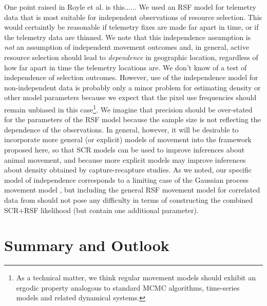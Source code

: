 One point raised in Royle et al. is this......
We used an RSF model for telemetry data that is most suitable for
independent observations of resource selection.  This would certaintly
be reasonable if telemetry fixes are made far apart in time, or if the
telemetry data are thinned.  We note that this independence assumption
is {\it not} an assumption of independent movement outcomes and, in
general, active resource selection should lead to {\it dependence} in
geographic location, regardless of how far apart in time the telemetry
locations are.  We don't know of a test of independence of selection
outcomes. However, use of the independence model for non-independent
data is probably only a minor problem for estimating density or other
model parameters because we expect that the pixel use frequencies
should remain unbiased in this case\footnote{As a technical matter, we
  think regular movement models should exhibit an ergodic property
  analogous to standard MCMC algorithms, time-series models and
  related dynamical systems.}.  We imagine that precision should be
over-stated for the parameters of the RSF model because the sample
size is not reflecting the dependence of the observations.  In
general, however, it will be desirable to incorporate more general (or
explicit) models of movement into the framework proposed here, so that
SCR models can be used to improve inferences about animal movement,
and because more explicit models may improve inferences about density
obtained by capture-recapture studies.  As we noted, our specific
model of independence corresponds to a limiting case of the Gaussian
process movement model \citep{johnson_etal:2008}, but including the
general RSF movement model for correlated data from
\citet{johnson_etal:2008} should not pose any difficulty in terms of
constructing the combined SCR+RSF likelihood (but contain one
additional parameter).




\section{Summary and Outlook}


